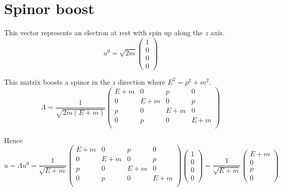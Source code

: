 



\section*{Spinor boost}

This vector represents an electron at rest with spin up along the $z$ axis.
\begin{equation*}
u^0=\sqrt{2m}\begin{pmatrix}1\\0\\0\\0\end{pmatrix}
\end{equation*}

This matrix boosts a spinor in the $z$ direction where $E^2=p^2+m^2$.
\begin{equation*}
\Lambda=\frac{1}{\sqrt{2m(E+m)}}
\begin{pmatrix}
E+m & 0 & p & 0\\
0 & E+m & 0 & p\\
p & 0 & E+m & 0\\
0 & p & 0 & E+m\\
\end{pmatrix}
\end{equation*}

Hence
\begin{equation*}
u=\Lambda u^0=\frac{1}{\sqrt{E+m}}
\begin{pmatrix}
E+m & 0 & p & 0\\
0 & E+m & 0 & p\\
p & 0 & E+m & 0\\
0 & p & 0 & E+m\\
\end{pmatrix}
\begin{pmatrix}1\\0\\0\\0\end{pmatrix}
=\frac{1}{\sqrt{E+m}}\begin{pmatrix}E+m\\0\\p\\0\end{pmatrix}
\end{equation*}

